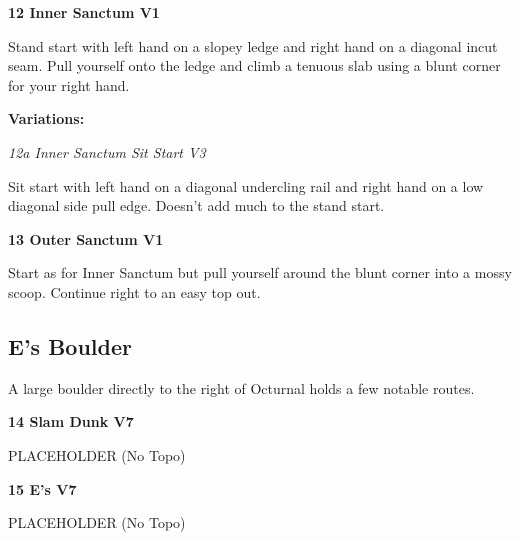 \begin{multicols}{2}
					\begin{minipage}{\linewidth}	
					\label{rt:Inner Sanctum}\colorbox{green!20}{\textbf{12 Inner Sanctum V1 \ding{72}   \warn }}
					\begin{adjustwidth}{0.5cm}{}				
					Stand start with left hand on a slopey ledge and right hand on a diagonal incut seam. Pull yourself onto the ledge and climb a tenuous slab using a blunt corner for your right hand.
					\end{adjustwidth}
					\end{minipage}
						\begin{adjustwidth}{0.5cm}{}				
						\textbf{Variations:} \newline
							\begin{minipage}{\linewidth}	
							\label{vr:Inner Sanctum Sit Start}\colorbox{green!20}{\emph{12a Inner Sanctum Sit Start V3   }}
							\begin{adjustwidth}{0.5cm}{}				
							Sit start with left hand on a diagonal undercling rail and right hand on a low diagonal side pull edge. Doesn't add much to the stand start.
							\end{adjustwidth}
							\end{minipage}
						\end{adjustwidth}
					\begin{minipage}{\linewidth}	
					\label{rt:Outer Sanctum}\colorbox{green!20}{\textbf{13 Outer Sanctum V1 \ding{72}  }}
					\begin{adjustwidth}{0.5cm}{}				
					Start as for Inner Sanctum but pull yourself around the blunt corner into a mossy scoop. Continue right to an easy top out.
					\end{adjustwidth}
					\end{minipage}
			\subsection*{E's Boulder}\label{bf:E's Boulder}
			\begin{minipage}{\columnwidth}
			A large boulder directly to the right of Octurnal holds a few notable routes.
			\end{minipage}
			
					\begin{minipage}{\linewidth}	
					\label{rt:Slam Dunk}\colorbox{Goldenrod!50}{\textbf{14 Slam Dunk V7  }}
					\begin{adjustwidth}{0.5cm}{}				
					PLACEHOLDER
						\newline (No Topo) 
					\end{adjustwidth}
					\end{minipage}
					\begin{minipage}{\linewidth}	
					\label{rt:E's}\colorbox{Goldenrod!50}{\textbf{15 E's V7  }}
					\begin{adjustwidth}{0.5cm}{}				
					PLACEHOLDER
						\newline (No Topo) 
					\end{adjustwidth}
					\end{minipage}


\end{multicols}
